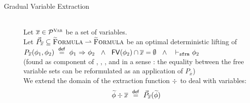 \begin{description}
    \begin{comment} %
    \item[Gradual Variable Extraction]
    Let $\dgrad{P}_x \subseteq \setGFormula \rightharpoonup \setGFormula$ be an optimal deterministic lifting of 
    \\$P_x(\phi_1, \phi_2) ~\defeq~ \phiImplies{\phi_1}{\phi_2} ~~\wedge~~ x \not \in \FV(\phi_2) ~~\wedge~~ \sfrmphi \phi_2$ 
    \\(found as component of \tset{HAlloc}, \tset{HVarAssign}, \tset{HReturn}, \tset{HCall} and in a sense \tset{HHold}: the equality between the free variable sets can be reformulated as repeated application of $P_x$)
    \\We extend the domain of the extraction function $\wo{}{}$ to deal with variables:
    \begin{displaymath}
    \wo{\grad{\phi}}{x} ~\defeq~ \dgrad{P}_x(\grad{\phi})
    \end{displaymath}
    \end{comment}
    
    \item[Gradual Variable Extraction]~\\
    Let $\overline{x} \in \mathcal{P}^{\textup{\textsc{Var}}}$ be a set of variables.\\
    Let $\vec{P}_{\overline{x}} \subseteq \textup{\textsc{\ensuremath{\widetilde{\text{F}}}ormula}} \rightharpoonup \textup{\textsc{\ensuremath{\widetilde{\text{F}}}ormula}}$ be an optimal deterministic lifting of 
    \\$P_{\overline{x}}(\phi_1, \phi_2) ~\overset{\textup{\textmd{\textsf{def}}}}{=}~ {\phi_1} \,\,{\Rightarrow}\,\, {\phi_2} ~~\wedge~~ \textup{\textmd{\textsf{FV}}}(\phi_2) \cap \overline{x} = \emptyset ~~\wedge~~ \,\,{\vdash_\texttt{sfrm}}\,\, \phi_2$ 
    \\(found as component of , , ,  and in a sense : the equality between the free variable sets can be reformulated as an application of $P_{\overline{x}}$)
    \\We extend the domain of the extraction function $\div$ to deal with variables:
    \begin{displaymath}
    \widetilde{\phi}\div\overline{x} ~\overset{\textup{\textmd{\textsf{def}}}}{=}~ \vec{P}_{\overline{x}}(\widetilde{\phi})
    \end{displaymath}
\end{description}